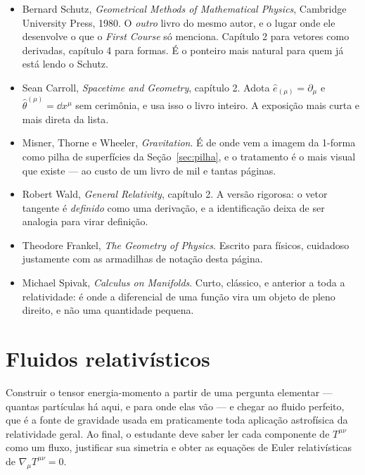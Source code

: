 \documentclass[12pt,a4paper,oneside]{book}
\theoremstyle{rgplain}
\theoremstyle{rgremark}
\begin{document}
\begin{leitura}[title={\sffamily\bfseries\footnotesize\color{rgPetroClaro}LEITURA EXTRA\hspace{0.7em}\textbullet\hspace{0.7em}VETORES SÃO DERIVADAS, 1-FORMAS SÃO DIFERENCIAIS}]
\begin{itemize}\setlength{\itemsep}{2pt}
  \item Bernard Schutz, \textit{Geometrical Methods of Mathematical Physics},
  Cambridge University Press, 1980. O \emph{outro} livro do mesmo autor, e o
  lugar onde ele desenvolve o que o \textit{First Course} só menciona. Capítulo
  2 para vetores como derivadas, capítulo 4 para formas. É o ponteiro mais
  natural para quem já está lendo o Schutz.

  \item Sean Carroll, \textit{Spacetime and Geometry}, capítulo 2. Adota
  $\hat e_{(\mu)}=\partial_\mu$ e $\hat\theta^{(\mu)}=\dd x^\mu$ sem cerimônia,
  e usa isso o livro inteiro. A exposição mais curta e mais direta da lista.

  \item Misner, Thorne e Wheeler, \textit{Gravitation}. É de onde vem a imagem
  da 1-forma como pilha de superfícies da Seção~\ref{sec:pilha}, e o tratamento
  é o mais visual que existe --- ao custo de um livro de mil e tantas páginas.

  \item Robert Wald, \textit{General Relativity}, capítulo 2. A versão
  rigorosa: o vetor tangente é \emph{definido} como uma derivação, e a
  identificação deixa de ser analogia para virar definição.

  \item Theodore Frankel, \textit{The Geometry of Physics}. Escrito para
  físicos, cuidadoso justamente com as armadilhas de notação desta página.

  \item Michael Spivak, \textit{Calculus on Manifolds}. Curto, clássico, e
  anterior a toda a relatividade: é onde a diferencial de uma função vira um
  objeto de pleno direito, e não uma quantidade pequena.
\end{itemize}

\end{leitura}

\chapter{Fluidos relativísticos}
\label{cap:fluidos}

\begin{objetivos}
Construir o tensor energia-momento a partir de uma pergunta elementar ---
quantas partículas há aqui, e para onde elas vão --- e chegar ao fluido
perfeito, que é a fonte de gravidade usada em praticamente toda aplicação
astrofísica da relatividade geral. Ao final, o estudante deve saber ler cada
componente de $T^{\mu\nu}$ como um fluxo, justificar sua simetria e obter as
equações de Euler relativísticas de $\nabla_\mu T^{\mu\nu}=0$.
\end{objetivos}
\end{document}

